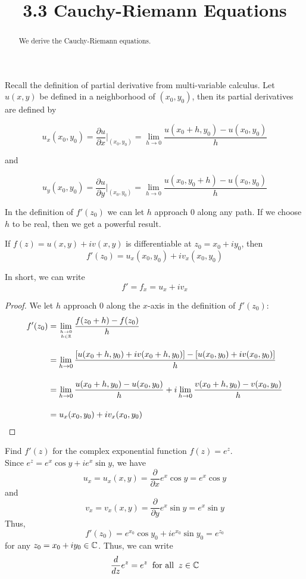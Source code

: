 \documentclass[handout]{ximera}
\title{3.3 Cauchy-Riemann Equations}
\begin{document}
\begin{abstract}
We derive the Cauchy-Riemann equations.
\end{abstract}

\maketitle

Recall the definition of partial derivative from multi-variable calculus.  
Let $u(x,y)$ be defined in a neighborhood of $(x_0,y_0)$, then its partial derivatives are defined by

\[
u_x(x_0, y_0) = \frac{\partial u}{\partial x}\Big|_{(x_0,y_0)} = \lim_{h \to 0} \frac{u(x_0 +h, y_0) - u(x_0,y_0)}{h}
\]

and

\[
u_y(x_0, y_0) = \frac{\partial u}{\partial y}\Big|_{(x_0,y_0)} = \lim_{h \to 0} \frac{u(x_0 , y_0+h) - u(x_0,y_0)}{h}
\]

In the definition of $f'(z_0)$ we can let $h$ approach $0$ along any path. If we choose $h$ to be real, then we get a powerful result.
\begin{theorem}
If $f(z) = u(x,y) + iv(x,y)$ is differentiable at $z_0 = x_0 + iy_0$, then
\[
f'(z_0) = u_x(x_0,y_0) + iv_x(x_0,y_0)
\]
\end{theorem}

\begin{remark}
In short, we can write
\[
f' = f_x = u_x + iv_x
\]
\end{remark}

\begin{proof}
We let $h$ approach $0$ along the $x$-axis in the definition of $f'(z_0)$:
\begin{align*}
f'(z_0) &= \lim_{h \to 0 \atop h \in \mathbb R} \frac{f(z_0 + h) -f(z_0)}{h} \\[10pt]
        &= \lim_{h \to 0} \frac{\left[u(x_0 +h, y_0) + iv(x_0 +h, y_0)\right] - \left[u(x_0,y_0)+iv(x_0, y_0)\right]}{h} \\[10pt]
        &=  \lim_{h \to 0} \frac{u(x_0 +h, y_0)- u(x_0,y_0)}{h} +i\lim_{h \to 0}\frac{v(x_0 +h, y_0)-v(x_0, y_0)}{h} \\[10pt]
        &= u_x(x_0,y_0) + iv_x(x_0,y_0)
\end{align*}
\end{proof}




\begin{example}
Find $f'(z)$ for the complex exponential function $f(z) = e^z$.\\
Since $e^z = e^x \cos y + i e^x \sin y$, we have
\[
u_x = u_x(x,y) = \frac{\partial}{\partial x} e^x \cos y = e^x \cos y 
\]
and
\[
 v_x = v_x(x,y) = \frac{\partial}{\partial y}e^x \sin y = e^x \sin y
\]
Thus, 
\[
f'(z_0) = e^{x_0} \cos y_0 + i e^{x_0} \sin y_0  = e^{z_0}
\]
for any $z_0 = x_0 + iy_0 \in \mathbb C$.
Thus, we can write
\[
\frac{d}{dz} e^z = e^z \;\; \mbox{for all} \;\; z \in \mathbb C
\]
\end{example}
\end{document}

